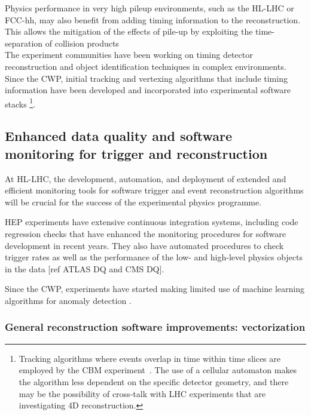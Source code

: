 Physics performance in very high pileup environments, such as the HL-LHC
or FCC-hh, may also benefit from adding timing information to the
reconstruction. This allows the mitigation of the effects of pile-up by
exploiting the time-separation of collision products~\cite{Collaboration:2623663,CMS:2667167}\\
The experiment communities have been working on timing detector
reconstruction and object identification techniques in complex
environments. Since the CWP, initial tracking and vertexing algorithms
that include timing information have been developed and incorporated
into experimental software stacks \cite{LindseyGreyMIPCTD}\footnote{Tracking algorithms where events overlap in time
within time slices are employed by the CBM experiment~\cite{Akishina:2015ghv,AkishinaThesis}. The use of a cellular automaton makes the
  algorithm less dependent on the specific detector geometry, and there
  may be the possibility of cross-talk with LHC experiments that are
  investigating 4D reconstruction.}.

\hypertarget{enhanced-data-quality-and-software-monitoring-for-trigger-and-reconstruction}{%
\subsection{Enhanced data quality and software monitoring for trigger
and
reconstruction}\label{enhanced-data-quality-and-software-monitoring-for-trigger-and-reconstruction}}

At HL-LHC, the development, automation, and deployment of extended and
efficient monitoring tools for software trigger and event reconstruction
algorithms will be crucial for the success of the experimental physics
programme.

HEP experiments have extensive continuous integration systems, including
code regression checks that have enhanced the monitoring procedures for
software development in recent years. They also have automated
procedures to check trigger rates as well as the performance of the low-
and high-level physics objects in the data {[}ref ATLAS DQ and CMS
DQ{]}.

Since the CWP, experiments have started making limited use of machine
learning algorithms for anomaly detection \cite{Adinolfi:2298467,CMSMonitoring}.

\hypertarget{general-reconstruction-software-improvements-vectorization}{%
\subsubsection{General reconstruction software improvements:
vectorization}\label{general-reconstruction-software-improvements-vectorization}}

